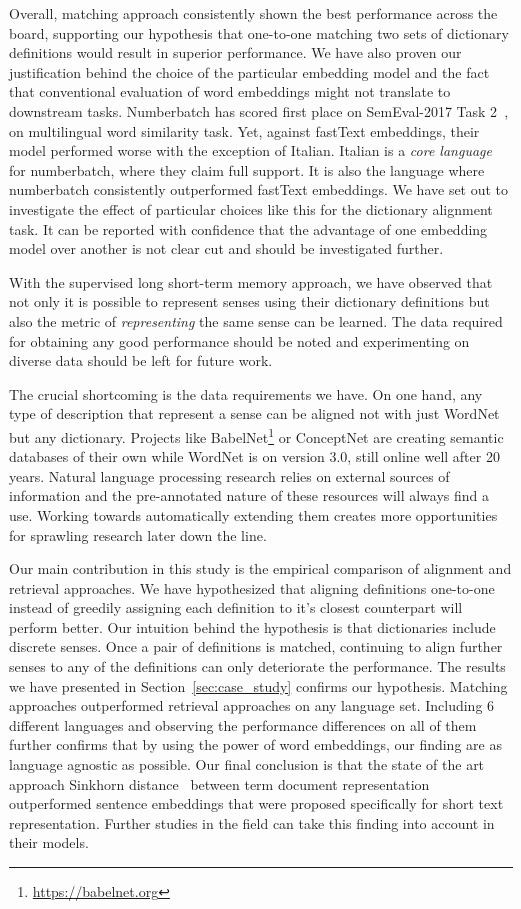 Overall, matching approach consistently shown the best performance across the board, supporting our hypothesis that one-to-one matching two sets of dictionary definitions would result in superior performance.
We have also proven our justification behind the choice of the particular embedding model and the fact that conventional evaluation of word embeddings might not translate to downstream tasks.
Numberbatch has scored first place on SemEval-2017 Task 2~\cite{camachocollados-EtAl:2017:SemEval}, on multilingual word similarity task.
Yet, against fastText embeddings, their model performed worse with the exception of Italian.
Italian is a \emph{core language} for numberbatch, where they claim full support.
It is also the language where numberbatch consistently outperformed fastText embeddings.
We have set out to investigate the effect of particular choices like this for the dictionary alignment task.
It can be reported with confidence that the advantage of one embedding model over another is not clear cut and should be investigated further.

With the supervised long short-term memory approach, we have observed that not only it is possible to represent senses using their dictionary definitions but also the metric of \emph{representing} the same sense can be learned.
The data required for obtaining any good performance should be noted and experimenting on diverse data should be left for future work.

The crucial shortcoming is the data requirements we have.
On one hand, any type of description that represent a sense can be aligned not with just WordNet but any dictionary.
Projects like BabelNet\footnote{\url{https://babelnet.org}} or ConceptNet are creating semantic databases of their own while WordNet is on version 3.0, still online well after 20 years.
Natural language processing research relies on external sources of information and the pre-annotated nature of these resources will always find a use.
Working towards automatically extending them creates more opportunities for sprawling research later down the line.

Our main contribution in this study is the empirical comparison of alignment and retrieval approaches.
We have hypothesized that aligning definitions one-to-one instead of greedily assigning each definition to it's closest counterpart will perform better.
Our intuition behind the hypothesis is that dictionaries include discrete senses.
Once a pair of definitions is matched, continuing to align further senses to any of the definitions can only deteriorate the performance.
The results we have presented in Section~\ref{sec:case_study} confirms our hypothesis.
Matching approaches outperformed retrieval approaches on any language set.
Including 6 different languages and observing the performance differences on all of them further confirms that by using the power of word embeddings, our finding are as language agnostic as possible.
Our final conclusion is that the state of the art approach Sinkhorn distance~\cite{balikasCrosslingual2018} between term document representation outperformed sentence embeddings that were proposed specifically for short text representation.
Further studies in the field can take this finding into account in their models.

